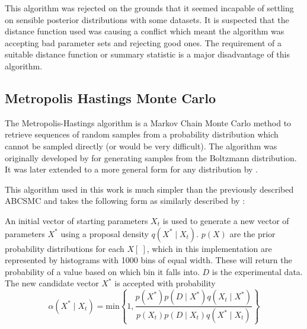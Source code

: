 
This algorithm was rejected on the grounds that it seemed incapable of settling on sensible posterior distributions with some datasets. It is suspected that the distance function used was causing a conflict which meant the algorithm was accepting bad parameter sets and rejecting good ones. The requirement of a suitable distance function or summary statistic is a major disadvantage of this algorithm.

\subsection{Metropolis Hastings Monte Carlo}
The Metropolis-Hastings algorithm is a Markov Chain Monte Carlo method to retrieve sequences of random samples from a probability distribution which cannot be sampled directly (or would be very difficult). The algorithm was originally developed by \citet{Metropolis1953} for generating samples from the Boltzmann distribution. It was later extended to a more general form for any distribution by \citet{Hastings1970}.

This algorithm used in this work is much simpler than the previously described ABCSMC and takes the following form as similarly described by \citet{Christensen2004}:

An initial vector of starting parameters $X_t$ is used to generate a new vector of parameters $X^*$ using a proposal density $q(X^{*} \mid{} X_t)$. $p(X)$ are the prior probability distributions for each $X[~]$, which in this implementation are represented by histograms with 1000 bins of equal width. These will return the probability of a value based on which bin it falls into. $D$ is the experimental data. The new candidate vector $X^*$ is accepted with probability
\begin{equation*}
\alpha(X^*\mid{}X_t) = \mathrm{min} \left\lbrace 1, \dfrac{p(X^*)p(D\mid{}X^*)q(X_t\mid{}X^*)}{p(X_t)p(D\mid{}X_t)q(X^*\mid{}X_t)}\right\rbrace
\end{equation*}

